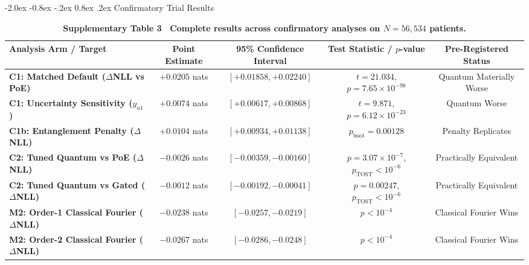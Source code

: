 \documentclass[10pt,a4paper]{article}
\makeatletter
\renewcommand{\subsection}{\@startsection{subsection}{2}{\z@}%
  {-2.0ex \@plus -0.8ex \@minus -.2ex}%
  {0.8ex \@plus.2ex}%
  {\normalfont\large\sffamily\bfseries\color{naturedark}}}
\makeatother
\begin{document}
\subsection{Confirmatory Trial Results}
\begin{table}[h]
\centering
\small
\caption*{\textbf{\textsf{Supplementary Table 3 \textbar\ Complete results across confirmatory analyses on $N=56,534$ patients.}}}
\begin{tabular}{lcccc}
\toprule
\textbf{Analysis Arm / Target} & \textbf{Point Estimate} & \textbf{95\% Confidence Interval} & \textbf{Test Statistic / $p$-value} & \textbf{Pre-Registered Status} \\
\midrule
\textbf{C1: Matched Default ($\Delta$NLL vs PoE)} & $+0.0205$ nats & $[+0.01858, +0.02240]$ & $t = 21.034$, $p = 7.65 \times 10^{-98}$ & Quantum Materially Worse \\
\textbf{C1: Uncertainty Sensitivity ($y_{u1}$)} & $+0.0074$ nats & $[+0.00617, +0.00868]$ & $t = 9.871$, $p = 6.12 \times 10^{-23}$ & Quantum Worse \\
\textbf{C1b: Entanglement Penalty ($\Delta$NLL)} & $+0.0104$ nats & $[+0.00934, +0.01138]$ & $p_{\text{boot}} = 0.00128$ & Penalty Replicates \\
\textbf{C2: Tuned Quantum vs PoE ($\Delta$NLL)} & $-0.0026$ nats & $[-0.00359, -0.00160]$ & $p = 3.07 \times 10^{-7}$, $p_{\text{TOST}} < 10^{-6}$ & Practically Equivalent \\
\textbf{C2: Tuned Quantum vs Gated ($\Delta$NLL)} & $-0.0012$ nats & $[-0.00192, -0.00041]$ & $p = 0.00247$, $p_{\text{TOST}} < 10^{-6}$ & Practically Equivalent \\
\textbf{M2: Order-1 Classical Fourier ($\Delta$NLL)} & $-0.0238$ nats & $[-0.0257, -0.0219]$ & $p < 10^{-4}$ & Classical Fourier Wins \\
\textbf{M2: Order-2 Classical Fourier ($\Delta$NLL)} & $-0.0267$ nats & $[-0.0286, -0.0248]$ & $p < 10^{-4}$ & Classical Fourier Wins \\
\bottomrule
\end{tabular}
\end{table}
\end{document}

